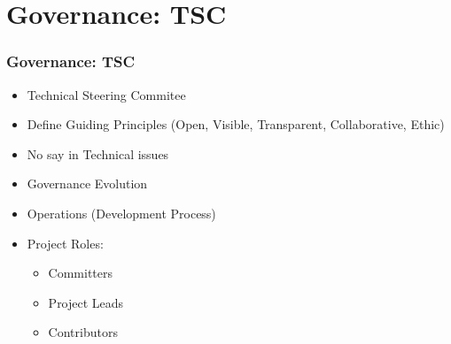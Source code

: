 \section{Governance: TSC}

\begin{frame}
\frametitle{Governance: TSC}

\begin{itemize}
 \item Technical Steering Commitee
 \item Define Guiding Principles (Open, Visible, Transparent, Collaborative, Ethic)
 \item No say in Technical issues
 \item Governance Evolution
 \item Operations (Development Process)
 \item Project Roles:
 \begin{itemize}
   \item Committers
   \item Project Leads
   \item Contributors
 \end{itemize}
\end{itemize}

\end{frame}
